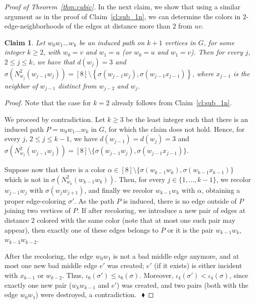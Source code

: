 \documentclass[12pt,a4paper]{article}
\newtheorem{claim}{Claim}
\newcommand{\set}[1]{\ensuremath{\left\{#1 \right\}}}
\newenvironment{proofclaim}[1][]%
    {\noindent \emph{Proof.} {}{#1}{}}{$~$\hfill $~\blacklozenge$ \vspace{0.2cm}}
\begin{document}
\begin{proof}[Proof of Theorem~\ref{thm:cubic}]
	In the next claim, we show that using a similar argument as in the proof of Claim~\ref{cl:sub_1n}, 
	we can determine the colors in $2$-edge-neighborhoods of the edges at distance more than $2$ from $uv$.

	\begin{claim}
		\label{cl:sub_2}
		Let $w_0w_1\dots w_k$ be an induced path on $k+1$ vertices in $G$, for some integer $k \ge 2$, 
		with $w_0 = v$ and $w_1 = u$ (or $w_0 = u$ and $w_1 = v$). 
		Then for every $j$, $2 \le j \le k$, we have that $d(w_j) = 3$ 
		and $\sigma(N^2_{w_j}(w_{j-1}w_j)) = [8] \setminus \set{\sigma(w_{j-1}w_j), \sigma(w_{j-1}x_{j-1})}$,
		where $x_{j-1}$ is the neighbor of $w_{j-1}$ distinct from $w_{j-2}$ and $w_j$.
	\end{claim}	

	\begin{proofclaim}	
		Note that the case for $k=2$ already follows from Claim~\ref{cl:sub_1n}.
		
		We proceed by contradiction. 
		Let $k \ge 3$ be the least integer such that there is an induced path 
		$P = w_0w_1\dots w_k$ in $G$, for which the claim does not hold. 
		Hence, for every $j$, $2 \le j \le k-1$, we have $d(w_{j-1}) = d(w_j) = 3$ and 
		$\sigma(N^2_{w_j}(w_{j-1}w_j)) = [8] \setminus \{\sigma(w_{j-1}w_j), \sigma(w_{j-1}x_{j-1})\}$.
		
		Suppose now that there is a color 
		$\alpha\in [8] \setminus \{\sigma(w_{k-1}w_k), \sigma(w_{k-1}x_{k-1})\}$ 
		which is not in $\sigma(N^2_{w_k}(w_{k-1}w_k))$. 
		Then, for every $j \in \{1,\dots,k-1\}$, we recolor $w_{j-1}w_j$ with $\sigma(w_jw_{j+1})$,
		and finally we recolor $w_{k-1}w_k$ with $\alpha$, obtaining a proper edge-coloring $\sigma'$. 
		As the path $P$ is induced, there is no edge outside of $P$ joining two vertices of $P$. 
		If after recoloring, we introduce a new pair of edges at distance $2$ 
		colored with the same color (note that at most one such pair may appear), 
		then exactly one of these edges belongs to $P$ or it is the pair $w_{k-1}w_k$, $w_{k-3}w_{k-2}$. 
		
		After the recoloring, the edge $w_0w_1$ is not a bad middle edge anymore,
		and at most one new bad middle edge $e'$ was created; 
		$e'$ (if it exists) is either incident with $x_{k-1}$ or $w_{k-2}$. 
		Thus, $\iota_6(\sigma') \le \iota_6(\sigma)$. 
		Moreover, $\iota_4(\sigma') < \iota_4(\sigma)$, 
		since exactly one new pair ($w_kw_{k-1}$ and $e'$) was created, 
		and two pairs (both with the edge $w_0w_1$) were destroyed, a contradiction.
	\end{proofclaim}	


\end{proof}
\end{document}
